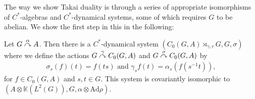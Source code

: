 The way we show Takai duality is through a series of appropriate isomorphisms of $C^*$-algebras and $C^*$-dynamical systems, some of which requires $G$ to be abelian. We show the first step in this in the following:
\begin{theorem}
Let $G \stackrel{\alpha}{\curvearrowright} A$. Then there is a $C^*$-dynamical system $(C_0(G,A) \rtimes_{\gamma,r} G , G, \sigma )$ where we define the actions $G \stackrel{\gamma}{\curvearrowright} C_0(G,A)$ and $G \stackrel{\sigma}{\curvearrowright} C_0(G,A)$ by
\begin{align*}
	\sigma_s (f)(t) = f(ts) \text{ and } \gamma_s f(t) = \alpha_s(f(s^{-1}t)),
\end{align*}
for $f \in C_0(G,A)$ and $s,t \in G$. This system is covariantly isomorphic to $(A \otimes \mathbb{K}(L^2(G)), G , \alpha \otimes \mathrm{Ad} \rho)$.
\label{takai:compactiso}
\end{theorem}
